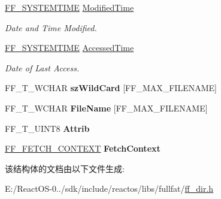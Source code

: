 \begin{DoxyCompactItemize}
\mbox{\label{struct_f_f___d_i_r_e_n_t_a775d65d0bdd9976321882b7462fd4a87}} 
\hyperlink{struct_f_f___s_y_s_t_e_m_t_i_m_e}{F\+F\+\_\+\+S\+Y\+S\+T\+E\+M\+T\+I\+ME} \hyperlink{struct_f_f___d_i_r_e_n_t_a775d65d0bdd9976321882b7462fd4a87}{Modified\+Time}
\begin{DoxyCompactList}\small\item\em Date and Time Modified. \end{DoxyCompactList}\item 
\mbox{\label{struct_f_f___d_i_r_e_n_t_aa1fc98b895f60b67890a78c9c216a222}} 
\hyperlink{struct_f_f___s_y_s_t_e_m_t_i_m_e}{F\+F\+\_\+\+S\+Y\+S\+T\+E\+M\+T\+I\+ME} \hyperlink{struct_f_f___d_i_r_e_n_t_aa1fc98b895f60b67890a78c9c216a222}{Accessed\+Time}
\begin{DoxyCompactList}\small\item\em Date of Last Access. \end{DoxyCompactList}\item 
\mbox{\label{struct_f_f___d_i_r_e_n_t_a616fe1c8f8a05bc0dd91951c69a865c5}} 
F\+F\+\_\+\+T\+\_\+\+W\+C\+H\+AR {\bfseries sz\+Wild\+Card} \mbox{[}F\+F\+\_\+\+M\+A\+X\+\_\+\+F\+I\+L\+E\+N\+A\+ME\mbox{]}
\item 
\mbox{\label{struct_f_f___d_i_r_e_n_t_a670cd55c5da85bc4d0ba80744673e434}} 
F\+F\+\_\+\+T\+\_\+\+W\+C\+H\+AR {\bfseries File\+Name} \mbox{[}F\+F\+\_\+\+M\+A\+X\+\_\+\+F\+I\+L\+E\+N\+A\+ME\mbox{]}
\item 
\mbox{\label{struct_f_f___d_i_r_e_n_t_aba9fcf2bb0172d98d6bb390a8e6340fb}} 
F\+F\+\_\+\+T\+\_\+\+U\+I\+N\+T8 {\bfseries Attrib}
\item 
\mbox{\label{struct_f_f___d_i_r_e_n_t_aea369edd612d0cea2a58b4e6f9f00ccf}} 
\hyperlink{struct_f_f___f_e_t_c_h___c_o_n_t_e_x_t}{F\+F\+\_\+\+F\+E\+T\+C\+H\+\_\+\+C\+O\+N\+T\+E\+XT} {\bfseries Fetch\+Context}
\end{DoxyCompactItemize}


该结构体的文档由以下文件生成\+:\begin{DoxyCompactItemize}
\item 
E\+:/\+React\+O\+S-\/0../sdk/include/reactos/libs/fullfat/\hyperlink{ff__dir_8h}{ff\+\_\+dir.\+h}\end{DoxyCompactItemize}
